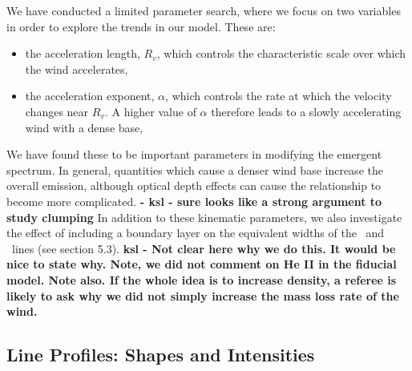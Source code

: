 \documentclass[preprint, a4paper, 11pt]{aastex}
\begin{document}
{%
We have conducted a limited parameter 
search, where we focus on 
two variables in order to explore the trends in our model. 
These are:

\begin{itemize}
 	\item the acceleration length, $R_v$, which controls the characteristic scale
 	over which the wind accelerates,
 	\item the acceleration exponent, $\alpha$, which controls the rate 
 	at which the velocity changes near $R_v$. 
 	A higher value of $\alpha$ therefore leads to a slowly accelerating 
 	wind with a dense base,
 \end{itemize} 

We have found these to be important parameters in modifying 
the emergent spectrum.
In general, quantities which cause a denser wind base increase
the overall emission, although optical depth effects can cause 
the relationship to become more complicated. {\bf - ksl - sure looks like a strong argument to study clumping} In addition to these 
kinematic parameters, we also investigate the effect of 
including a boundary layer on the equivalent widths of the 
\civfull\ and \heiiuv\ lines (see section 5.3).  {\bf ksl - Not clear here why we do this.  It would be nice to state why.  Note, we did not comment on He II in the fiducial model.  Note also.  If the whole idea is to increase density, a referee is likely to ask why we did not simply increase the mass loss rate of the wind.}



\subsection{Line Profiles: Shapes and Intensities}



}
\end{document}

